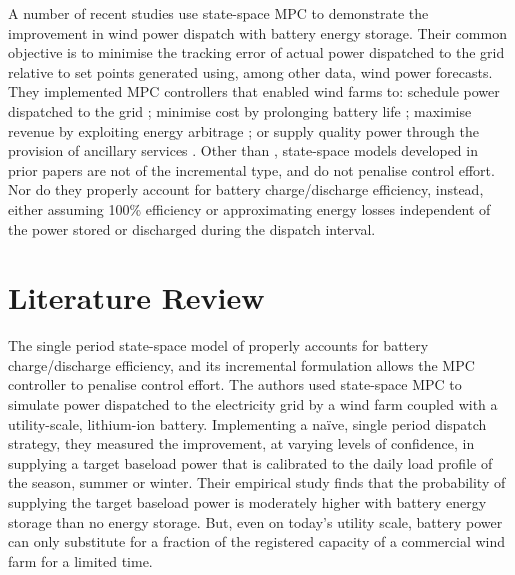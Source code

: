 \documentclass[a4paper, 10pt, twocolumn, preprint, 3p]{elsarticle}
\begin{document}
A number of recent studies use state-space MPC to demonstrate the improvement in wind power dispatch with battery energy storage.  Their common objective is to minimise the tracking error of actual power dispatched to the grid relative to set points generated using, among other data, wind power forecasts.  They implemented MPC controllers that enabled wind farms to: schedule power dispatched to the grid \cite{HALBB14,TBBH10}; minimise cost by prolonging battery life \cite{KS10,YCTL12}; maximise revenue by exploiting energy arbitrage \cite{KKSA13}; or supply quality power through the provision of ancillary services \cite{YCTL14}.  Other than \cite{TREB16}, state-space models developed in prior papers are not of the incremental type, and do not penalise control effort.  Nor do they properly account for battery charge/discharge efficiency, instead, either assuming 100\% efficiency or approximating energy losses independent of the power stored or discharged during the dispatch interval.

\section{Literature Review}\label{sect:lit_review}
The single period state-space model of \cite{TREB16} properly accounts for battery charge/discharge efficiency, and its incremental formulation allows the MPC controller to penalise control effort.  The authors used state-space MPC to simulate power dispatched to the electricity grid by a wind farm coupled with a utility-scale, lithium-ion battery.  Implementing a na\"ive, single period dispatch strategy, they measured the improvement, at varying levels of confidence, in supplying a target baseload power that is calibrated to the daily load profile of the season, summer or winter.  Their empirical study finds that the probability of supplying the target baseload power is moderately higher with battery energy storage than no energy storage.  But, even on today's utility scale, battery power can only substitute for a fraction of the registered capacity of a commercial wind farm for a limited time.
\end{document}
